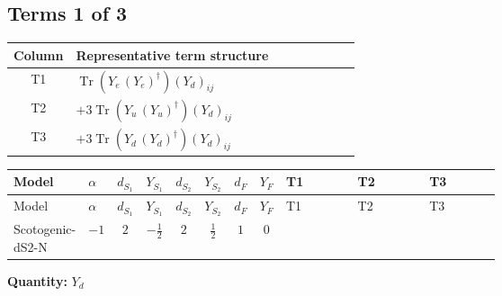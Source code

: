 \documentclass[8pt]{article}
\begin{document}
\begin{landscape}
\subsection*{Terms 1 of 3}
\begin{center}
\begin{tabular}{@{}c >{\raggedright\arraybackslash}p{0.82\linewidth}@{}}
\toprule
Column & Representative term structure \\
\midrule
T1 & \(\displaystyle \operatorname{Tr}\!\left({Y_e}\,\left({Y_e}\right)^{\dagger}\right) \left({Y_d}\right)_{ij}\) \\
\midrule
T2 & \(\displaystyle +3 \operatorname{Tr}\!\left({Y_u}\,\left({Y_u}\right)^{\dagger}\right) \left({Y_d}\right)_{ij}\) \\
\midrule
T3 & \(\displaystyle +3 \operatorname{Tr}\!\left({Y_d}\,\left({Y_d}\right)^{\dagger}\right) \left({Y_d}\right)_{ij}\) \\
\midrule
\bottomrule
\end{tabular}
\end{center}
\smallskip
\tiny
\begin{longtable}{@{}llcccccc >{\raggedright\arraybackslash}p{0.21\linewidth} >{\raggedright\arraybackslash}p{0.21\linewidth} >{\raggedright\arraybackslash}p{0.21\linewidth}@{}}
\toprule
Model & $\alpha$ & $d_{S_1}$ & $Y_{S_1}$ & $d_{S_2}$ & $Y_{S_2}$ & $d_F$ & $Y_F$ & T1 & T2 & T3 \\
\midrule
\endfirsthead
\toprule
Model & $\alpha$ & $d_{S_1}$ & $Y_{S_1}$ & $d_{S_2}$ & $Y_{S_2}$ & $d_F$ & $Y_F$ & T1 & T2 & T3 \\
\midrule
\endhead
Scotogenic-dS2-N & $-1$ & $2$ & $-\frac{1}{2}$ & $2$ & $\frac{1}{2}$ & $1$ & $0$ & \scriptsize\adjustbox{max width=\linewidth}{$\begin{gathered} \operatorname{Tr}\!\left({Y_e}\,\left({Y_e}\right)^{\dagger}\right) \left({Y_d}\right)_{ij}\end{gathered}$} & \scriptsize\adjustbox{max width=\linewidth}{$\begin{gathered} +3 \operatorname{Tr}\!\left({Y_u}\,\left({Y_u}\right)^{\dagger}\right) \left({Y_d}\right)_{ij}\end{gathered}$} & \scriptsize\adjustbox{max width=\linewidth}{$\begin{gathered} +3 \operatorname{Tr}\!\left({Y_d}\,\left({Y_d}\right)^{\dagger}\right) \left({Y_d}\right)_{ij}\end{gathered}$} \\
\midrule
\bottomrule
\end{longtable}
\clearpage
\noindent\textbf{Quantity: }$Y_d$\par\smallskip

\end{landscape}
\end{document}
